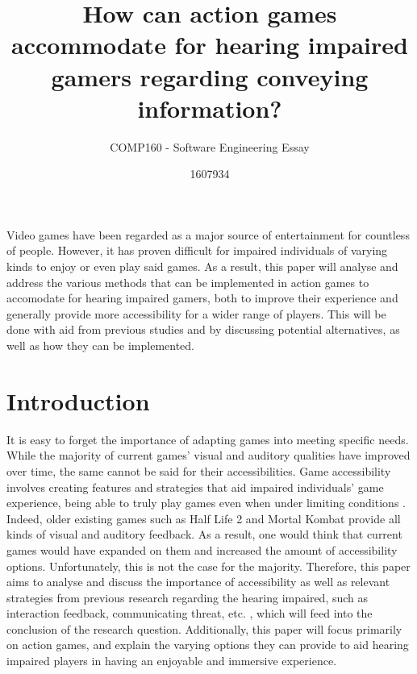 \documentclass{scrartcl}
\title{How can action games accommodate for hearing impaired gamers regarding conveying information?}
\subtitle{COMP160 - Software Engineering Essay}
\author{1607934}
\begin{document}
\maketitle

\abstract
Video games have been regarded as a major source of entertainment for countless of people. However, it has proven difficult for impaired individuals of varying kinds to enjoy or even play said games. As a result, this paper will analyse and address the various methods that can be implemented in action games to accomodate for hearing impaired gamers, both to improve their experience and generally provide more accessibility for a wider range of players. This will be done with aid from previous studies and by discussing potential alternatives, as well as how they can be implemented.

\section{Introduction}
It is easy to forget the importance of adapting games into meeting specific needs. While the majority of current games' visual and auditory qualities have improved over time, the same cannot be said for their accessibilities. Game accessibility involves creating features and strategies that aid impaired individuals' game experience, being able to truly play games even when under limiting conditions \cite{11}. Indeed, older existing games such as Half Life 2 \cite{Denise} and Mortal Kombat provide all kinds of visual and auditory feedback. As a result, one would think that current games would have expanded on them and increased the amount of accessibility options. Unfortunately, this is not the case for the majority. Therefore, this paper aims to analyse and discuss the importance of accessibility as well as relevant strategies from previous research regarding the hearing impaired, such as interaction feedback, communicating threat, etc. \cite{Denise}, which will feed into the conclusion of the research question. Additionally, this paper will focus primarily on action games, and explain the varying options they can provide to aid hearing impaired players in having an enjoyable and immersive experience.
\end{document}
